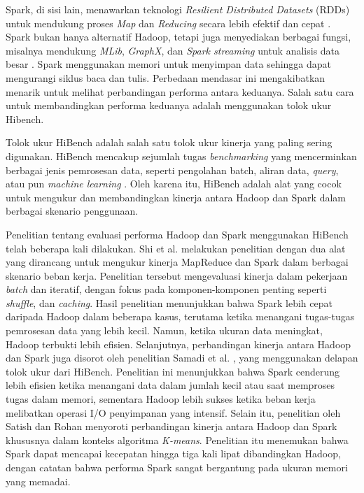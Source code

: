 Spark, di sisi lain, menawarkan teknologi \textit{Resilient Distributed Datasets} (RDDs) untuk mendukung proses \textit{Map} dan \textit{Reducing} secara lebih efektif dan cepat \cite{ahmadvandGapproxUsingGallup2019}. Spark bukan hanya alternatif Hadoop, tetapi juga menyediakan berbagai fungsi, misalnya mendukung \textit{MLib}, \textit{GraphX}, dan \textit{Spark streaming} untuk analisis data besar \cite{zahariaSparkClusterComputing2010}. Spark menggunakan memori untuk menyimpan data sehingga dapat mengurangi siklus baca dan tulis. Perbedaan mendasar ini mengakibatkan menarik untuk melihat perbandingan performa antara keduanya. Salah satu cara untuk membandingkan performa keduanya adalah menggunakan tolok ukur Hibench.

Tolok ukur HiBench adalah salah satu tolok ukur kinerja yang paling sering digunakan. HiBench mencakup sejumlah tugas \textit{benchmarking} yang mencerminkan berbagai jenis pemrosesan data, seperti pengolahan batch, aliran data, \textit{query}, atau pun \textit{machine learning} \cite{huangHiBenchBenchmarkSuitea}. Oleh karena itu, HiBench adalah alat yang cocok untuk mengukur dan membandingkan kinerja antara Hadoop dan Spark dalam berbagai skenario penggunaan.

Penelitian tentang evaluasi performa Hadoop dan Spark menggunakan HiBench telah beberapa kali dilakukan. Shi et al. \cite{shiClashTitansMapReduce2015} melakukan penelitian dengan dua alat yang dirancang untuk mengukur kinerja MapReduce dan Spark dalam berbagai skenario beban kerja. Penelitian tersebut mengevaluasi kinerja dalam pekerjaan \textit{batch} dan iteratif, dengan fokus pada komponen-komponen penting seperti \textit{shuffle}, dan \textit{caching}. Hasil penelitian menunjukkan bahwa Spark lebih cepat daripada Hadoop dalam beberapa kasus, terutama ketika menangani tugas-tugas pemrosesan data yang lebih kecil. Namun, ketika ukuran data meningkat, Hadoop terbukti lebih efisien. Selanjutnya, perbandingan kinerja antara Hadoop dan Spark juga disorot oleh penelitian Samadi et al. \cite{samadiComparativeStudyHadoop2016}, yang menggunakan delapan tolok ukur dari HiBench. Penelitian ini menunjukkan bahwa Spark cenderung lebih efisien ketika menangani data dalam jumlah kecil atau saat memproses tugas dalam memori, sementara Hadoop lebih sukses ketika beban kerja melibatkan operasi I/O penyimpanan yang intensif. Selain itu, penelitian oleh Satish dan Rohan \cite{gopalaniComparingApacheSpark2015} menyoroti perbandingan kinerja antara Hadoop dan Spark khususnya dalam konteks algoritma \textit{K-means}. Penelitian itu menemukan bahwa Spark dapat mencapai kecepatan hingga tiga kali lipat dibandingkan Hadoop, dengan catatan bahwa performa Spark sangat bergantung pada ukuran memori yang memadai.

